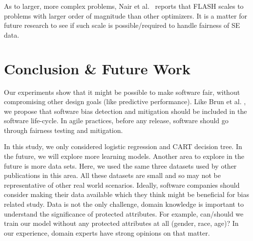 \documentclass[10pt,conference,review]{IEEEtran}
\begin{document}
As to larger, more complex problems, Nair et al.~\cite{8469102} reports
that FLASH scales to problems with larger order of magnitude than other optimizers. It is a matter for future research to see if such scale is possible/required to handle fairness of SE data. 


\section{Conclusion \& Future Work} Our experiments show that it might be  possible to make software fair, without compromising other design goals (like predictive performance). Like Brun et al. \cite{Brun:2018:SF:3236024.3264838}, we   propose that software bias detection and mitigation should be included in the software life-cycle. In agile practices, before any release, software should go through fairness testing and mitigation. 


In this study, we only considered logistic regression and CART decision tree. In the future, we will explore more learning models. Another area to explore in the future is more data sets.
Here, we used the same three datasets used by other  publications in this area. All these datasets are small and so may not be representative of 
other real world scenarios. Ideally,  software companies should consider making  their data available which they think might be beneficial for bias related study. Data is not the only challenge,  domain knowledge is important to understand the significance of protected attributes. For example,
can/should we  train our model without
any protected attributes at all (gender, race, age)? In our experience,  domain experts have strong opinions
on that matter.



\balance


\end{document}

